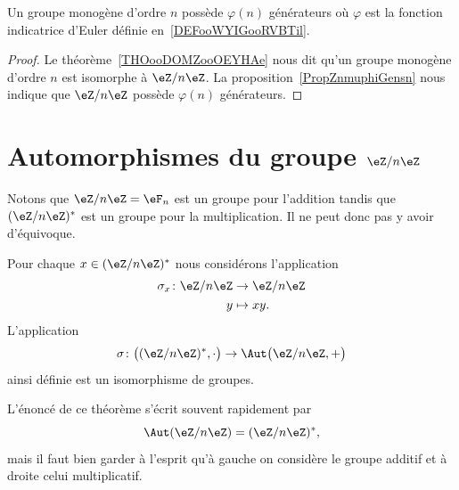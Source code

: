 \begin{corollary}\label{CORooMBLSooMHKmAq}
    Un groupe monogène d'ordre \( n\) possède \( \varphi(n)\) générateurs où \( \varphi\) est la fonction indicatrice d'Euler définie en~\ref{DEFooWYIGooRVBTil}.
\end{corollary}

\begin{proof}
    Le théorème~\ref{THOooDOMZooOEYHAe} nous dit qu'un groupe monogène d'ordre \( n\) est isomorphe à \( \eZ/n\eZ\). La proposition~\ref{PropZnmuphiGensn} nous indique que \( \eZ/n\eZ\) possède \( \varphi(n)\) générateurs.
\end{proof}

\section{Automorphismes du groupe \texorpdfstring{$ \eZ/n\eZ$}{Z/nZ}}

Notons que \( \eZ/n\eZ=\eF_n\) est un groupe pour l'addition tandis que \( (\eZ/n\eZ)^*\) est un groupe pour la multiplication. Il ne peut donc pas y avoir d'équivoque.

\begin{theorem}   \label{ThoozyeSn}
    Pour chaque \( x\in (\eZ/n\eZ)^*\) nous considérons l'application
    \begin{equation}
        \begin{aligned}
            \sigma_x\colon \eZ/n\eZ&\to \eZ/n\eZ \\
            y&\mapsto xy.
        \end{aligned}
    \end{equation}
    L'application
    \begin{equation}
        \sigma\colon \big( (\eZ/n\eZ)^*,\cdot\big)\to \Aut\big( \eZ/n\eZ,+ \big)
    \end{equation}
    ainsi définie est un isomorphisme de groupes.
\end{theorem}
L'énoncé de ce théorème s'écrit souvent rapidement par
\begin{equation}
    \Aut(\eZ/n\eZ)=(\eZ/n\eZ)^*,
\end{equation}
mais il faut bien garder à l'esprit qu'à gauche on considère le groupe additif et à droite celui multiplicatif.


